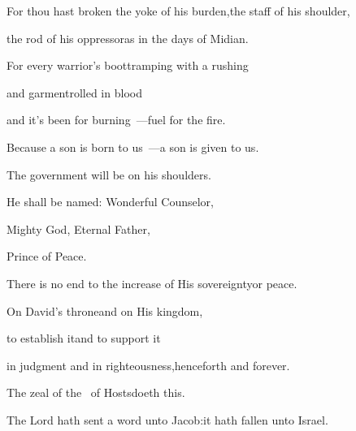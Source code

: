 
\begin{inparaenum}
  \pa{} For thou hast broken the yoke of his burden,\pa{}the staff of his shoulder,%

  \pa{}the rod of his oppressor\pa{}as in the days of Midian.%

  \pa{} For every warrior's boot\pa{}tramping with a rushing%

  \pa{}and garment\pa{}rolled in blood%

  \pa{}and it's been for burning~---\pa{}fuel for the fire.%

  \pa{} Because a son is born to us~---\pa{}a son is given to us.%

  \pa{}The government will be on his shoulders.%

  \pa{}He shall be named: Wonderful Counselor,%

  \pa{}Mighty God, Eternal Father,%

  \pa{}Prince of Peace.%

  \pa{} There is no end to the increase of His sovereignty\pa{}or peace.%

  \pa{}On David's throne\pa{}and on His kingdom,%

  \pa{}to establish it\pa{}and to support it%

  \pa{}in judgment and in righteousness,\pa{}henceforth and forever.%

  \pa{}The zeal of the \lord\ of Hosts\pa{}doeth this.%

  \pa{} The Lord hath sent a word unto Jacob:\pa{}it hath fallen unto Israel.%
\end{inparaenum}
